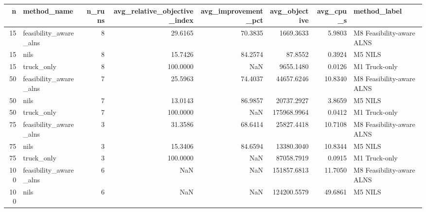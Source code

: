 \begin{tabular}{rlrrrrrl}
\toprule
n & method_name & n_runs & avg_relative_objective_index & avg_improvement_pct & avg_objective & avg_cpu_s & method_label \\
\midrule
15 & feasibility_aware_alns & 8 & 29.6165 & 70.3835 & 1669.3633 & 5.9803 & M8 Feasibility-aware ALNS \\
15 & nils & 8 & 15.7426 & 84.2574 & 87.8552 & 0.3924 & M5 NILS \\
15 & truck_only & 8 & 100.0000 & NaN & 9655.1480 & 0.0126 & M1 Truck-only \\
50 & feasibility_aware_alns & 7 & 25.5963 & 74.4037 & 44657.6246 & 10.8340 & M8 Feasibility-aware ALNS \\
50 & nils & 7 & 13.0143 & 86.9857 & 20737.2927 & 3.8659 & M5 NILS \\
50 & truck_only & 7 & 100.0000 & NaN & 175968.9964 & 0.0412 & M1 Truck-only \\
75 & feasibility_aware_alns & 3 & 31.3586 & 68.6414 & 25827.4418 & 10.7108 & M8 Feasibility-aware ALNS \\
75 & nils & 3 & 15.3406 & 84.6594 & 13380.3040 & 10.8344 & M5 NILS \\
75 & truck_only & 3 & 100.0000 & NaN & 87058.7919 & 0.0915 & M1 Truck-only \\
100 & feasibility_aware_alns & 6 & NaN & NaN & 151857.6813 & 11.7050 & M8 Feasibility-aware ALNS \\
100 & nils & 6 & NaN & NaN & 124200.5579 & 49.6861 & M5 NILS \\
\bottomrule
\end{tabular}
